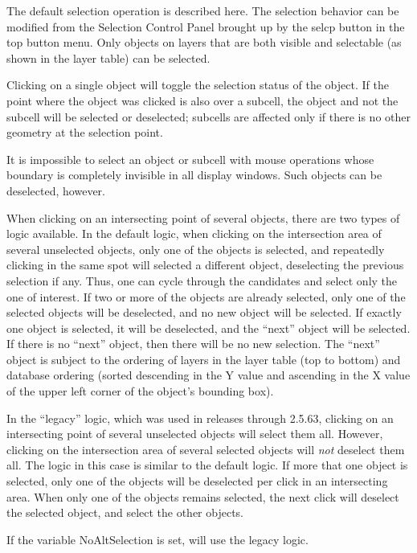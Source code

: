 The default selection operation is described here.  The selection
behavior can be modified from the {\cb Selection Control Panel}
brought up by the {\cb selcp} button in the top button menu.  Only
objects on layers that are both visible and selectable (as shown in
the layer table) can be selected.

Clicking on a single object will toggle the selection status of the
object.  If the point where the object was clicked is also over a
subcell, the object and not the subcell will be selected or
deselected; subcells are affected only if there is no other geometry
at the selection point.

It is impossible to select an object or subcell with mouse operations
whose boundary is completely invisible in all display windows.  Such
objects can be deselected, however.

When clicking on an intersecting point of several objects, there are
two types of logic available.  In the default logic, when clicking on
the intersection area of several unselected objects, only one of the
objects is selected, and repeatedly clicking in the same spot will
selected a different object, deselecting the previous selection if
any.  Thus, one can cycle through the candidates and select only the
one of interest.  If two or more of the objects are already selected,
only one of the selected objects will be deselected, and no new object
will be selected.  If exactly one object is selected, it will be
deselected, and the ``next'' object will be selected.  If there is no
``next'' object, then there will be no new selection.  The ``next''
object is subject to the ordering of layers in the layer table (top to
bottom) and database ordering (sorted descending in the Y value and
ascending in the X value of the upper left corner of the object's
bounding box).

In the ``legacy'' logic, which was used in releases through 2.5.63,
clicking on an intersecting point of several unselected objects will
select them all.  However, clicking on the intersection area of
several selected objects will {\it not} deselect them all.  The logic
in this case is similar to the default logic.  If more that one object
is selected, only one of the objects will be deselected per click in
an intersecting area.  When only one of the objects remains selected,
the next click will deselect the selected object, and select the other
objects.

If the variable {\et NoAltSelection} is set, {\Xic} will use the
legacy logic.


